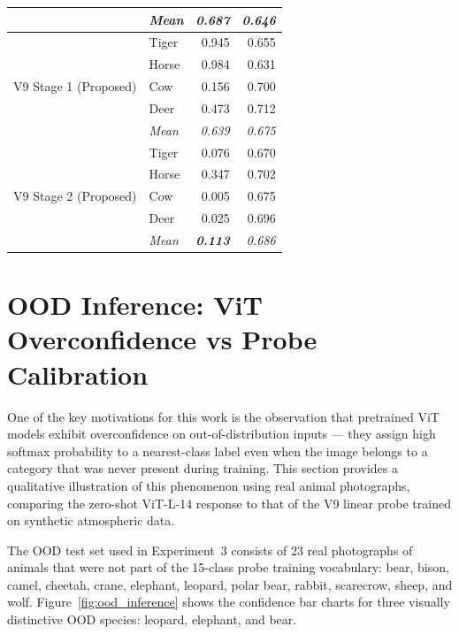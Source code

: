 \begin{table}[htbp]
\begin{tabular}{@{}llrr@{}}
    & \textit{Mean} & \textit{0.687} & \textit{0.646} \\
    \midrule
    \multirow{5}{*}{V9 Stage 1 (Proposed)} & Tiger & 0.945 & 0.655 \\
    & Horse & 0.984 & 0.631 \\
    & Cow & 0.156 & 0.700 \\
    & Deer & 0.473 & 0.712 \\
    & \textit{Mean} & \textit{0.639} & \textit{0.675} \\
    \midrule
    \multirow{5}{*}{V9 Stage 2 (Proposed)} & Tiger & 0.076 & 0.670 \\
    & Horse & 0.347 & 0.702 \\
    & Cow & 0.005 & 0.675 \\
    & Deer & 0.025 & 0.696 \\
    & \textit{Mean} & \textit{\textbf{0.113}} & \textit{0.686} \\
    \bottomrule
  \end{tabular}
\end{table}

\FloatBarrier
\section{OOD Inference: ViT Overconfidence vs Probe Calibration}
\label{sec:ood_inference}

\noindent One of the key motivations for this work is the observation that pretrained ViT models exhibit overconfidence on out-of-distribution inputs --- they assign high softmax probability to a nearest-class label even when the image belongs to a category that was never present during training. This section provides a qualitative illustration of this phenomenon using real animal photographs, comparing the zero-shot ViT-L-14 response to that of the V9 linear probe trained on synthetic atmospheric data.

\noindent The OOD test set used in Experiment~3 consists of 23 real photographs of animals that were not part of the 15-class probe training vocabulary: bear, bison, camel, cheetah, crane, elephant, leopard, polar bear, rabbit, scarecrow, sheep, and wolf. Figure~\ref{fig:ood_inference} shows the confidence bar charts for three visually distinctive OOD species: leopard, elephant, and bear.

